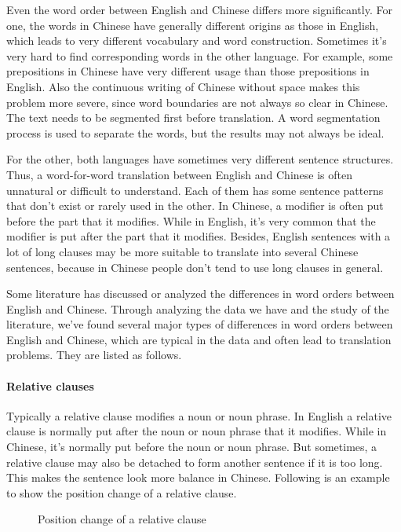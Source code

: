 Even the word order between English and Chinese differs more significantly. For one, the words in Chinese have generally different origins as those in English, which leads to very different vocabulary and word construction. Sometimes it's very hard to find corresponding words in the other language. For example, some prepositions in Chinese have very different usage than those prepositions in English. Also the continuous writing of Chinese without space makes this problem more severe, since word boundaries are not always so clear in Chinese. The text needs to be segmented first before translation. A word segmentation process is used to separate the words, but the results may not always be ideal.

For the other, both languages have sometimes very different sentence structures. Thus, a word-for-word translation between English and Chinese is often unnatural or difficult to understand. Each of them has some sentence patterns that don't exist or rarely used in the other. In Chinese, a modifier is often put before the part that it modifies. While in English, it's very common that the modifier is put after the part that it modifies. Besides, English sentences with a lot of long clauses may be more suitable to translate into several Chinese sentences, because in Chinese people don't tend to use long clauses in general. 

Some literature \citep{syntactic} has discussed or analyzed the differences in word orders between English and Chinese. Through analyzing the data we have and the study of the literature, we've found several major types of differences in word orders between English and Chinese, which are typical in the data and often lead to translation problems. They are listed as follows.

\paragraph{Relative clauses}
Typically a relative clause modifies a noun or noun phrase. In English a relative clause is normally put after the noun or noun phrase that it modifies. While in Chinese, it's normally put before the noun or noun phrase. But sometimes, a relative clause may also be detached to form another sentence if it is too long. This makes the sentence look more balance in Chinese. Following is an example to show the position change of a relative clause.
\begin{figure}[H]
\centering

\caption{Position change of a relative clause}
\end{figure}

